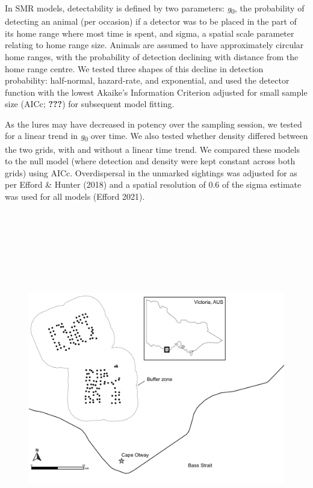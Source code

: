 \documentclass[11pt,a4paper,titlepage,twoside,openright]{style/unimelbthesis}
\begin{document}
\begin{mainmatter}
In SMR models, detectability is defined by two parameters: \emph{g}\textsubscript{0}, the probability of detecting an animal (per occasion) if a detector was to be placed in the part of its home range where most time is spent, and sigma, a spatial scale parameter relating to home range size. Animals are assumed to have approximately circular home ranges, with the probability of detection declining with distance from the home range centre. We tested three shapes of this decline in detection probability: half‐normal, hazard‐rate, and exponential, and used the detector function with the lowest Akaike's Information Criterion adjusted for small sample size (AICc; {\textbf{???}}) for subsequent model fitting.

As the lures may have decreased in potency over the sampling session, we tested for a linear trend in \emph{g}\textsubscript{0} over time. We also tested whether density differed between the two grids, with and without a linear time trend. We compared these models to the null model (where detection and density were kept constant across both grids) using AICc. Overdispersal in the unmarked sightings was adjusted for as per Efford \& Hunter (2018) and a spatial resolution of 0.6 of the sigma estimate was used for all models (Efford 2021).

\newpage

\(~\)

\(~\)

\(~\)

\(~\)
\begin{figure}

\hfill{}\includegraphics[width=1\linewidth]{figure/c2/c2_map} 


\end{figure}
\end{mainmatter}
\end{document}
